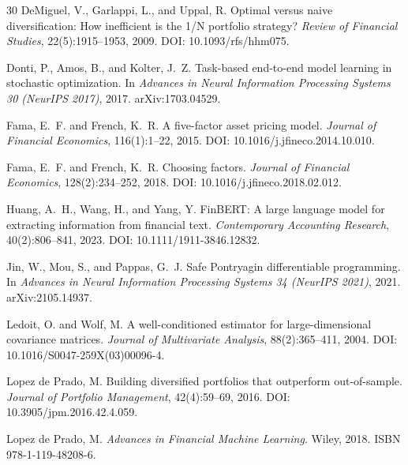 \documentclass{article}
\begin{document}
\begin{thebibliography}{30}
DeMiguel, V., Garlappi, L., and Uppal, R.
\newblock Optimal versus naive diversification: How inefficient is the 1/N portfolio strategy?
\newblock \emph{Review of Financial Studies}, 22(5):1915--1953, 2009.
\newblock DOI: 10.1093/rfs/hhm075.

Donti, P., Amos, B., and Kolter, J.~Z.
\newblock Task-based end-to-end model learning in stochastic optimization.
\newblock In \emph{Advances in Neural Information Processing Systems 30 (NeurIPS 2017)}, 2017. arXiv:1703.04529.

Fama, E.~F. and French, K.~R.
\newblock A five-factor asset pricing model.
\newblock \emph{Journal of Financial Economics}, 116(1):1--22, 2015.
\newblock DOI: 10.1016/j.jfineco.2014.10.010.

Fama, E.~F. and French, K.~R.
\newblock Choosing factors.
\newblock \emph{Journal of Financial Economics}, 128(2):234--252, 2018.
\newblock DOI: 10.1016/j.jfineco.2018.02.012.

Huang, A.~H., Wang, H., and Yang, Y.
\newblock FinBERT: A large language model for extracting information from financial text.
\newblock \emph{Contemporary Accounting Research}, 40(2):806--841, 2023.
\newblock DOI: 10.1111/1911-3846.12832.

Jin, W., Mou, S., and Pappas, G.~J.
\newblock Safe Pontryagin differentiable programming.
\newblock In \emph{Advances in Neural Information Processing Systems 34 (NeurIPS 2021)}, 2021. arXiv:2105.14937.

Ledoit, O. and Wolf, M.
\newblock A well-conditioned estimator for large-dimensional covariance matrices.
\newblock \emph{Journal of Multivariate Analysis}, 88(2):365--411, 2004.
\newblock DOI: 10.1016/S0047-259X(03)00096-4.

Lopez de Prado, M.
\newblock Building diversified portfolios that outperform out-of-sample.
\newblock \emph{Journal of Portfolio Management}, 42(4):59--69, 2016.
\newblock DOI: 10.3905/jpm.2016.42.4.059.

Lopez de Prado, M.
\newblock \emph{Advances in Financial Machine Learning}.
\newblock Wiley, 2018.
\newblock ISBN 978-1-119-48208-6.


\end{thebibliography}
\end{document}
